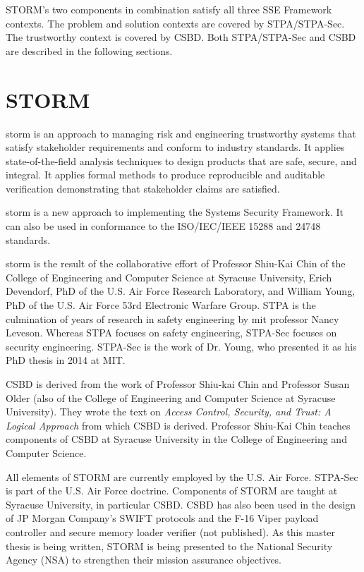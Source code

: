 \documentclass[../../main/main.tex]{subfiles}
\begin{document}
STORM's two components in combination satisfy all three SSE Framework contexts.  The problem and solution contexts are covered by STPA/STPA-Sec.  The trustworthy context is covered by CSBD.  Both STPA/STPA-Sec and CSBD are described in the following sections.


\section{STORM}\label{sec:storm}

\Gls{storm} is an approach to managing risk and engineering trustworthy systems that satisfy stakeholder requirements and conform to industry standards.  It applies state-of-the-field analysis techniques to design products that are safe, secure, and integral.  It applies formal methods to produce reproducible and auditable verification demonstrating that stakeholder claims are satisfied.  


\gls{storm} is a new approach to implementing the Systems Security Framework.  It can also be used in conformance to the ISO/IEC/IEEE 15288 and 24748 standards.  

\gls{storm} is the result of the collaborative effort of Professor Shiu-Kai Chin of the College of Engineering and Computer Science at Syracuse University, Erich Devendorf, PhD of the U.S. Air Force Research Laboratory, and William Young, PhD of the U.S. Air Force 53rd Electronic Warfare Group.  STPA is the culmination of years of research in safety engineering by \Gls{mit} professor Nancy Leveson.  Whereas STPA focuses on safety engineering, STPA-Sec focuses on security engineering.  STPA-Sec is the work of Dr. Young, who presented it as his PhD thesis in 2014 at MIT.  

CSBD is derived from the work of Professor Shiu-kai Chin and Professor Susan Older (also of the College of Engineering and Computer Science at Syracuse University).  They wrote the text on \textit{Access Control, Security, and Trust: A Logical Approach} \cite{ChinOlder} from which CSBD is derived.  Professor Shiu-Kai Chin teaches components of CSBD at Syracuse University in the College of Engineering and Computer Science.  


All elements of STORM are currently employed by the U.S. Air Force. STPA-Sec is part of the U.S. Air Force doctrine. Components of STORM are taught at Syracuse University, in particular CSBD. CSBD has also been used in the design of JP Morgan Company's SWIFT protocols \cite{pkm} and the F-16 Viper payload controller and secure memory loader verifier (not published). As this master thesis is being written, STORM is being presented to the National Security Agency (NSA) to strengthen their mission assurance objectives.
\end{document}
